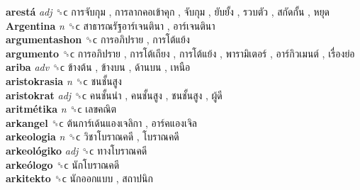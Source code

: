 \textbf{arestá} \emph{adj}  ␝ϲ   การจับกุม ,  การลากคอเข้าคุก ,  จับกุม ,  ยับยั้ง ,  รวบตัว ,  สกัดกั้น ,  หยุด   \\
\textbf{Argentina} \emph{n}  ␝ϲ   สาธารณรัฐอาร์เจนตินา ,  อาร์เจนตินา   \\
\textbf{argumentashon} ␝ϲ   การอภิปราย ,  การโต้แย้ง   \\
\textbf{argumento} ␝ϲ   การอภิปราย ,  การโต้เถียง ,  การโต้แย้ง ,  พารามิเตอร์ ,  อาร์กิวเมนต์ ,  เรื่องย่อ   \\
\textbf{ariba} \emph{adv}  ␝ϲ   ข้างต้น ,  ข้างบน ,  ด้านบน ,  เหนือ   \\
\textbf{aristokrasia} \emph{n}  ␝ϲ   ชนชั้นสูง   \\
\textbf{aristokrat} \emph{adj}  ␝ϲ   คนชั้นนำ ,  คนชั้นสูง ,  ชนชั้นสูง ,  ผู้ดี   \\
\textbf{aritmétika} \emph{n}  ␝ϲ   เลขคณิต   \\
\textbf{arkangel} ␝ϲ   ต้นการ์เด้นแองเจลิกา ,  อาร์คแองเจิล   \\
\textbf{arkeologia} \emph{n}  ␝ϲ   วิชาโบราณคดี ,  โบราณคดี   \\
\textbf{arkeológiko} \emph{adj}  ␝ϲ   ทางโบราณคดี   \\
\textbf{arkeólogo} ␝ϲ   นักโบราณคดี   \\
\textbf{arkitekto} ␝ϲ   นักออกแบบ ,  สถาปนิก   \\
